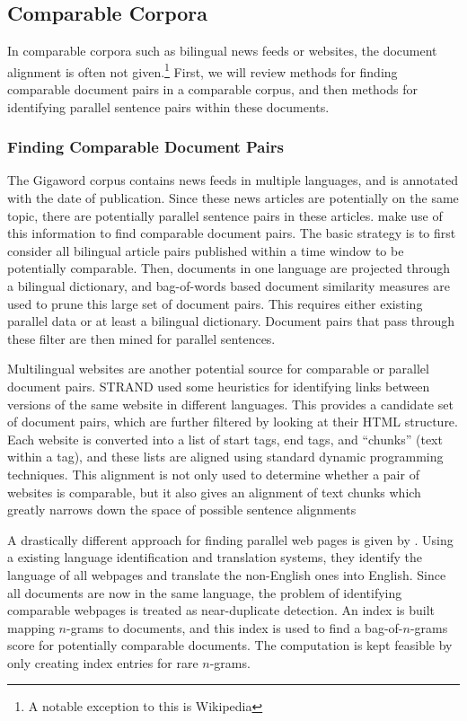 \subsection{Comparable Corpora}
\label{sec:nonnoisy_related}
In comparable corpora such as bilingual news feeds or websites, the document
alignment is often not given.\footnote{A notable exception to this is Wikipedia}
First, we will review methods for finding comparable document pairs in a
comparable corpus, and then methods for identifying parallel sentence pairs
within these documents.

\subsubsection{Finding Comparable Document Pairs}
The Gigaword corpus contains news feeds in multiple languages, and is annotated
with the date of publication. Since these news articles are potentially on the
same topic, there are potentially parallel sentence pairs in these articles.
\citet{Munteanu04,Munteanu05, Fung04a, Fung04b} make use of this information to
find comparable document pairs. The basic strategy is to first consider all
bilingual article pairs published within a time window to be potentially
comparable. Then, documents in one language are projected through a bilingual
dictionary, and bag-of-words based document similarity measures are used to
prune this large set of document pairs. This requires either existing parallel
data or at least a bilingual dictionary. Document pairs that pass through these
filter are then mined for parallel sentences.

Multilingual websites are another potential source for comparable or parallel
document pairs. STRAND \citep{Resnik03} used some heuristics for identifying
links between versions of the same website in different languages. This provides
a candidate set of document pairs, which are further filtered by looking at
their HTML structure. Each website is converted into a list of start tags, end
tags, and ``chunks'' (text within a tag), and these lists are aligned using
standard dynamic programming techniques. This alignment is not only used to
determine whether a pair of websites is comparable, but it also gives an
alignment of text chunks which greatly narrows down the space of possible
sentence alignments

A drastically different approach for finding parallel web pages is given by 
\citet{Uszkoreit10}. Using a existing language identification and translation
systems, they identify the language of all webpages and translate the
non-English ones into English. Since all documents are now in the same language,
the problem of identifying comparable webpages is treated as near-duplicate
detection. An index is built mapping $n$-grams to documents, and this index is
used to find a bag-of-$n$-grams score for potentially comparable documents. The
computation is kept feasible by only creating index entries for rare $n$-grams.

